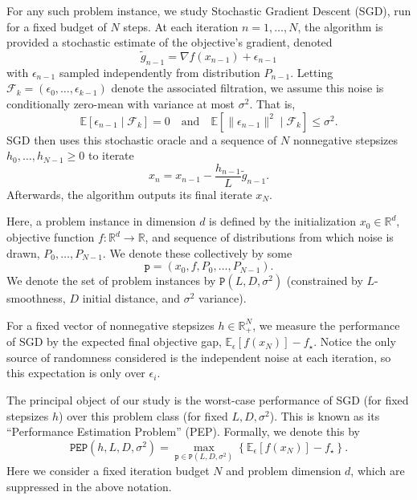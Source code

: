 \documentclass[11pt, hidelinks]{article}
\begin{document}
For any such problem instance, we study Stochastic Gradient Descent (SGD), run for a fixed budget of $N$ steps. At each iteration $n=1,\dots,N$, the algorithm is provided a stochastic estimate of the objective's gradient, denoted
\begin{equation}
    \widetilde g_{n-1} = \nabla f(x_{n-1}) + \epsilon_{n-1}
\end{equation}
with $\epsilon_{n-1}$ sampled independently from distribution $P_{n-1}$. Letting $\mathcal{F}_k=(\epsilon_0,\dots,\epsilon_{k-1})$ denote the associated filtration, we assume this noise is conditionally zero-mean with variance at most $\sigma^2$. That is,
\begin{equation*}
    \mathbb{E}[\epsilon_{n-1} \mid \mathcal{F}_k]=0 \quad \text{and} \quad \mathbb{E}[\|\epsilon_{n-1}\|^2 \mid \mathcal{F}_k ]\leq \sigma^2.
\end{equation*}
SGD then uses this stochastic oracle and a sequence of $N$ nonnegative stepsizes $h_{0},\dots,h_{N-1} \geq 0$ to iterate
\begin{equation} \label{eq:SGD}
    x_n = x_{n-1} - \frac{h_{n-1}}{L}\widetilde g_{n-1}.
\end{equation}
Afterwards, the algorithm outputs its final iterate $x_N$.

Here, a problem instance in dimension $d$ is defined by the initialization $x_0\in\mathbb{R}^d$, objective function $f\colon \mathbb{R}^d\rightarrow \mathbb{R}$, and sequence of distributions from which noise is drawn, $P_0,\dots,P_{N-1}$. We denote these collectively by some
\begin{equation*}
    \mathtt{p} = (x_0,f, P_0,\dots,P_{N-1}).
\end{equation*}
We denote the set of problem instances by $\mathtt{P}(L,D,\sigma^2)$ (constrained by $L$-smoothness, $D$ initial distance, and $\sigma^2$ variance).

For a fixed vector of nonnegative stepsizes $h\in\mathbb{R}^N_+$, we measure the performance of SGD by the expected final objective gap, $\mathbb{E}_{\epsilon} [f(x_N)] - f_\star$. Notice the only source of randomness considered is the independent noise at each iteration, so this expectation is only over $\epsilon_i$.


The principal object of our study is the worst-case performance of SGD (for fixed stepsizes $h$) over this problem class (for fixed $L,D,\sigma^2$). This is known as its ``Performance Estimation Problem'' (PEP). Formally, we denote this by
\begin{equation}\label{eq:PEP}
    \mathtt{PEP}(h,L,D,\sigma^2) = \max_{\mathtt{p} \in \mathtt{P}(L,D,\sigma^2)} \left\{\mathbb{E}_{\epsilon} \left[f(x_N)\right] - f_\star \right\}.
\end{equation}
Here we consider a fixed iteration budget $N$ and problem dimension $d$, which are suppressed in the above notation.
\end{document}
